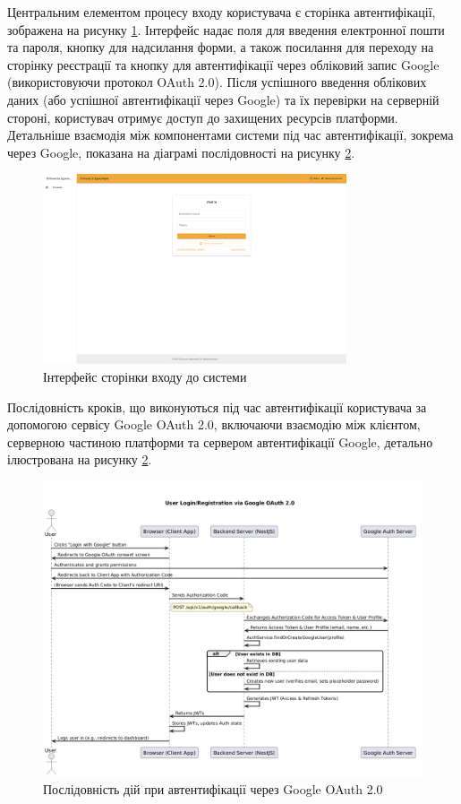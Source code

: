 Центральним елементом процесу входу користувача є сторінка автентифікації, зображена на рисунку \ref{fig:login_page}. Інтерфейс надає поля для введення електронної пошти та пароля, кнопку для надсилання форми, а також посилання для переходу на сторінку реєстрації та кнопку для автентифікації через обліковий запис Google (використовуючи протокол OAuth 2.0). Після успішного введення облікових даних (або успішної автентифікації через Google) та їх перевірки на серверній стороні, користувач отримує доступ до захищених ресурсів платформи. Детальніше взаємодія між компонентами системи під час автентифікації, зокрема через Google, показана на діаграмі послідовності на рисунку \ref{fig:google_oauth_flow}.

\begin{figure}[htbp]
    \centering
    \includegraphics[width=0.8\textwidth]{practice_report/images/login_page.png}
    \caption{Інтерфейс сторінки входу до системи}
    \label{fig:login_page}
\end{figure}

Послідовність кроків, що виконуються під час автентифікації користувача за допомогою сервісу Google OAuth 2.0, включаючи взаємодію між клієнтом, серверною частиною платформи та сервером автентифікації Google, детально ілюстрована на рисунку \ref{fig:google_oauth_flow}.

\begin{figure}[htbp]
    \centering
    \includegraphics[width=\textwidth]{practice_report/images/google_oauth_flow.png}
    \caption{Послідовність дій при автентифікації через Google OAuth 2.0}
    \label{fig:google_oauth_flow}
\end{figure}

